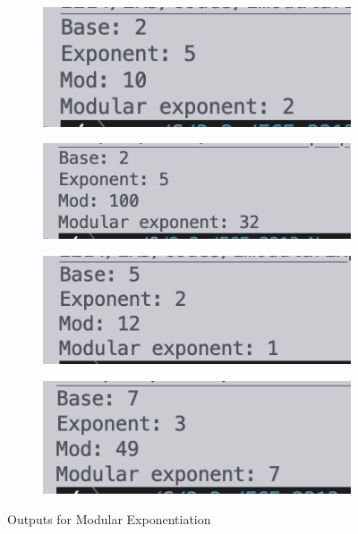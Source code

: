 \begin{figure}[H]
    \begin{subfigure}{.5\textwidth}
        \centering
        \includegraphics[width=.8\linewidth, height = .73in]{images/output/expo1.png}
        \caption*{}
        \label{fig:expo1}
    \end{subfigure}
    \begin{subfigure}{.5\textwidth}
        \centering
        \includegraphics[width=.8\linewidth]{images/output/expo2.png}
        \caption*{}
        \label{fig:expo2}
    \end{subfigure}
    \begin{subfigure}{.5\textwidth}
        \centering
        \includegraphics[width=.8\linewidth]{images/output/expo3.png}
        \caption*{}
        \label{fig:expo3}
    \end{subfigure}
    \begin{subfigure}{.5\textwidth}
        \centering
        \includegraphics[width=.8\linewidth]{images/output/expo4.png}
        \caption*{}
        \label{fig:expo4}
    \end{subfigure}
    \caption{Outputs for Modular Exponentiation}
    \label{fig:expo}
\end{figure}
